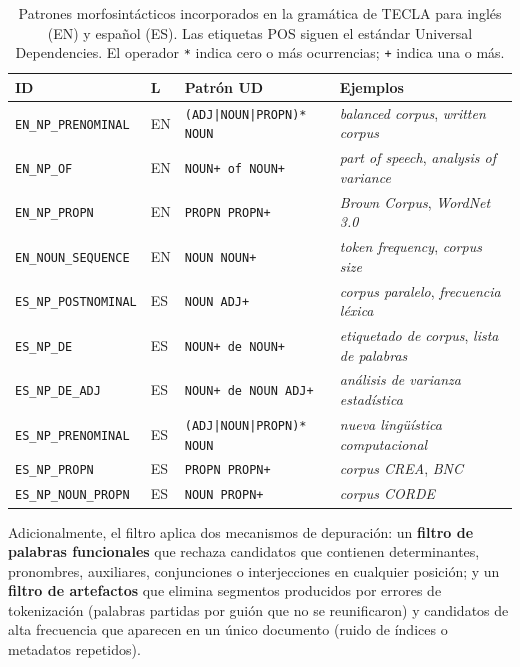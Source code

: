\begin{table}[H]
\centering
\small
\begin{tabular}{@{} l l p{4.5cm} p{4cm} @{}}
\toprule
\textbf{ID} & \textbf{L} & \textbf{Patrón UD} & \textbf{Ejemplos} \\
\midrule
\texttt{EN\_NP\_PRENOMINAL}  & EN & \texttt{(ADJ|NOUN|PROPN)* NOUN}   & \textit{balanced corpus}, \textit{written corpus} \\
\texttt{EN\_NP\_OF}          & EN & \texttt{NOUN+ of NOUN+}           & \textit{part of speech}, \textit{analysis of variance} \\
\texttt{EN\_NP\_PROPN}       & EN & \texttt{PROPN PROPN+}             & \textit{Brown Corpus}, \textit{WordNet 3.0} \\
\texttt{EN\_NOUN\_SEQUENCE}  & EN & \texttt{NOUN NOUN+}               & \textit{token frequency}, \textit{corpus size} \\
\midrule
\texttt{ES\_NP\_POSTNOMINAL} & ES & \texttt{NOUN ADJ+}                & \textit{corpus paralelo}, \textit{frecuencia léxica} \\
\texttt{ES\_NP\_DE}          & ES & \texttt{NOUN+ de NOUN+}           & \textit{etiquetado de corpus}, \textit{lista de palabras} \\
\texttt{ES\_NP\_DE\_ADJ}     & ES & \texttt{NOUN+ de NOUN ADJ+}       & \textit{análisis de varianza estadística} \\
\texttt{ES\_NP\_PRENOMINAL}  & ES & \texttt{(ADJ|NOUN|PROPN)* NOUN}   & \textit{nueva lingüística computacional} \\
\texttt{ES\_NP\_PROPN}       & ES & \texttt{PROPN PROPN+}             & \textit{corpus CREA}, \textit{BNC} \\
\texttt{ES\_NP\_NOUN\_PROPN} & ES & \texttt{NOUN PROPN+}              & \textit{corpus CORDE} \\
\bottomrule
\end{tabular}
\caption{Patrones morfosintácticos incorporados en la gramática de TECLA para inglés (EN) y español (ES). Las etiquetas POS siguen el estándar Universal Dependencies. El operador \texttt{*} indica cero o más ocurrencias; \texttt{+} indica una o más.}
\label{tab:patrones_extraccion}
\end{table}

Adicionalmente, el filtro aplica dos mecanismos de depuración: un \textbf{filtro de palabras funcionales} que rechaza candidatos que contienen determinantes, pronombres, auxiliares, conjunciones o interjecciones en cualquier posición; y un \textbf{filtro de artefactos} que elimina segmentos producidos por errores de tokenización (palabras partidas por guión que no se reunificaron) y candidatos de alta frecuencia que aparecen en un único documento (ruido de índices o metadatos repetidos).

